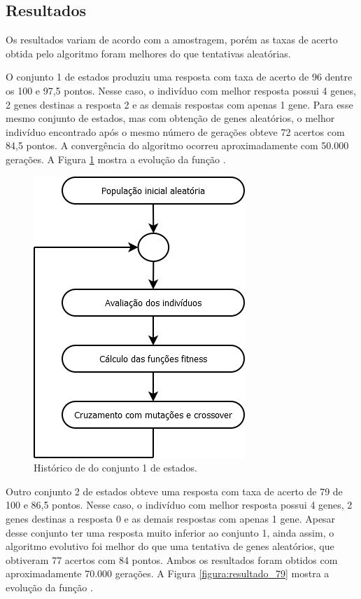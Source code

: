 \subsection{Resultados}

Os resultados variam de acordo com a amostragem, porém as taxas de acerto obtida pelo algoritmo foram melhores do que tentativas aleatórias.

O conjunto 1 de estados produziu uma resposta com taxa de acerto de 96 dentre os 100 e 97,5 pontos. Nesse caso, o indivíduo com melhor resposta possui 4 genes, 2 genes destinas a resposta 2 e as demais respostas com apenas 1 gene. Para esse mesmo conjunto de estados, mas com obtenção de genes aleatórios, o melhor indivíduo encontrado após o mesmo número de gerações obteve 72 acertos com 84,5 pontos. A convergência do algoritmo ocorreu aproximadamente com 50.000 gerações. A Figura \ref{figura:resultado_97} mostra a evolução da função \fitness.

\begin{figure}[htb]
    \caption{Histórico de \fitness do conjunto 1 de estados.}
    \label{figura:resultado_97}
    \centering
    \includegraphics[scale=1]{images/dia/fluxograma-ae}
    \fautor
\end{figure}

Outro conjunto 2 de estados obteve uma resposta com taxa de acerto de 79 de 100 e 86,5 pontos. Nesse caso, o indivíduo com melhor resposta possui 4 genes, 2 genes destinas a resposta 0 e as demais respostas com apenas 1 gene. Apesar desse conjunto ter uma resposta muito inferior ao conjunto 1, ainda assim, o algoritmo evolutivo foi melhor do que uma tentativa de genes aleatórios, que obtiveram 77 acertos com 84 pontos. Ambos os resultados foram obtidos com aproximadamente 70.000 gerações. A Figura \ref{figura:resultado_79} mostra a evolução da função \fitness.

